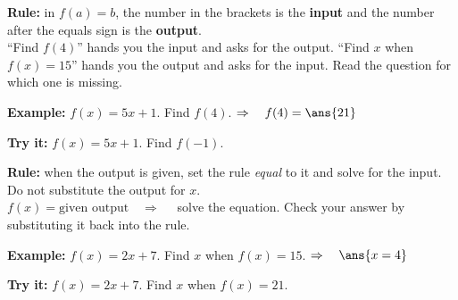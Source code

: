 \documentclass[12pt]{article}
\begin{document}


\begin{formulabox}
\textbf{Rule:} in $f(a) = b$, the number in the brackets is the \textbf{input} and the number
after the equals sign is the \textbf{output}.\\[3pt]
``Find $f(4)$'' hands you the input and asks for the output. ``Find $x$ when $f(x) = 15$'' hands
you the output and asks for the input. Read the question for which one is missing.
\end{formulabox}

\begin{examplebox}
\textbf{Example:} \quad $f(x) = 5x + 1$. \quad Find $f(4)$.
$\Rightarrow\quad f(4) = \ans{21}$
\end{examplebox}

\begin{tryitbox}
\textbf{Try it:} \quad $f(x) = 5x + 1$. \quad Find $f(-1)$.\\[2pt]
\end{tryitbox}


\begin{formulabox}
\textbf{Rule:} when the output is given, set the rule \textit{equal} to it and solve for the
input. Do not substitute the output for $x$.\\[3pt]
$f(x) = \text{given output} \quad\Longrightarrow\quad$ solve the equation.
Check your answer by substituting it back into the rule.
\end{formulabox}

\begin{examplebox}
\textbf{Example:} \quad $f(x) = 2x + 7$. \quad Find $x$ when $f(x) = 15$.
$\Rightarrow\quad \ans{x = 4}$
\end{examplebox}

\begin{tryitbox}
\textbf{Try it:} \quad $f(x) = 2x + 7$. \quad Find $x$ when $f(x) = 21$.\\[2pt]
\end{tryitbox}
\end{document}
